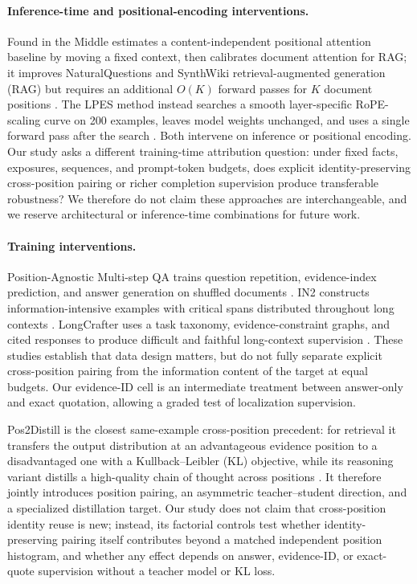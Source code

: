 \documentclass[11pt]{article}
\begin{document}
\paragraph{Inference-time and positional-encoding interventions.}
Found in the Middle estimates a content-independent positional attention baseline by moving a fixed context, then calibrates document attention for RAG; it improves NaturalQuestions and SynthWiki retrieval-augmented generation (RAG) but requires an additional $O(K)$ forward passes for $K$ document positions \citep{hsieh2024found}. The LPES method instead searches a smooth layer-specific RoPE-scaling curve on 200 examples, leaves model weights unchanged, and uses a single forward pass after the search \citep{lv2026lpes}. Both intervene on inference or positional encoding. Our study asks a different training-time attribution question: under fixed facts, exposures, sequences, and prompt-token budgets, does explicit identity-preserving cross-position pairing or richer completion supervision produce transferable robustness? We therefore do not claim these approaches are interchangeable, and we reserve architectural or inference-time combinations for future work.

\paragraph{Training interventions.}
Position-Agnostic Multi-step QA trains question repetition, evidence-index prediction, and answer generation on shuffled documents \citep{he2024never}. IN2 constructs information-intensive examples with critical spans distributed throughout long contexts \citep{an2024film}. LongCrafter uses a task taxonomy, evidence-constraint graphs, and cited responses to produce difficult and faithful long-context supervision \citep{yuan2026longcrafter}. These studies establish that data design matters, but do not fully separate explicit cross-position pairing from the information content of the target at equal budgets. Our evidence-ID cell is an intermediate treatment between answer-only and exact quotation, allowing a graded test of localization supervision.

Pos2Distill is the closest same-example cross-position precedent: for retrieval it transfers the output distribution at an advantageous evidence position to a disadvantaged one with a Kullback--Leibler (KL) objective, while its reasoning variant distills a high-quality chain of thought across positions \citep{wang2025pos2distill}. It therefore jointly introduces position pairing, an asymmetric teacher--student direction, and a specialized distillation target. Our study does not claim that cross-position identity reuse is new; instead, its factorial controls test whether identity-preserving pairing itself contributes beyond a matched independent position histogram, and whether any effect depends on answer, evidence-ID, or exact-quote supervision without a teacher model or KL loss.
\end{document}
